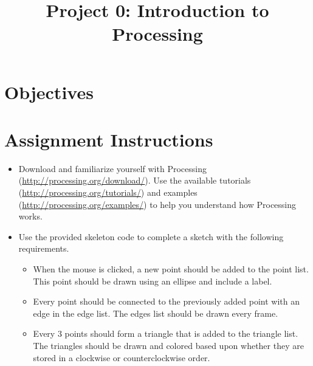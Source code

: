 \documentclass[a4paper,12pt]{article}
\title{Project 0: Introduction to Processing}
\begin{document}
\maketitle

\section{Objectives}



\projectGroundRules



\vspace{5pt}
\section{Assignment Instructions}

\begin{itemize}

\item Download and familiarize yourself with Processing (\url{http://processing.org/download/}). Use the available tutorials (\url{http://processing.org/tutorials/}) and examples (\url{http://processing.org/examples/}) to help you understand how Processing works.


\item Use the provided skeleton code to complete a sketch with the following requirements.

\begin{itemize}

\item When the mouse is clicked, a new point should be added to the point list. This point should be drawn using an ellipse and include a label.

\item Every point should be connected to the previously added point with an edge in the edge list. The edges list should be drawn every frame.

\item Every 3 points should form a triangle that is added to the triangle list. The triangles should be drawn and colored based upon whether they are stored in a clockwise or counterclockwise order.

\end{itemize}

\end{itemize}
\end{document}
